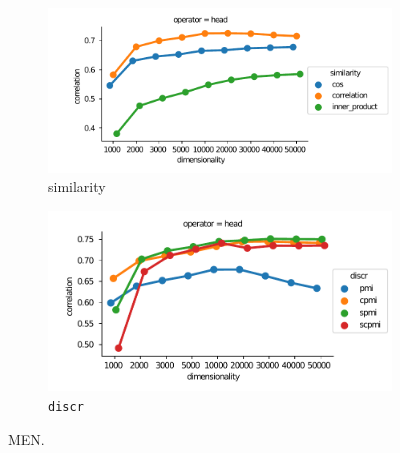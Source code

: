 \begin{figure}[b]
  \centering
  \begin{subfigure}[t]{0.49\textwidth}
    \hspace{-20pt}
    \includegraphics[width=1.1\textwidth]{supplement/figures/men-interaction-similarity}

  \caption{similarity}
  \label{fig:men-similarity}
  \end{subfigure}
  \begin{subfigure}[t]{0.49\textwidth}
    \includegraphics[width=\textwidth]{supplement/figures/men-interaction-discr}

  \caption{\texttt{discr}}
  \label{fig:men-discr}
  \end{subfigure}

  \caption{MEN.}
\end{figure}
